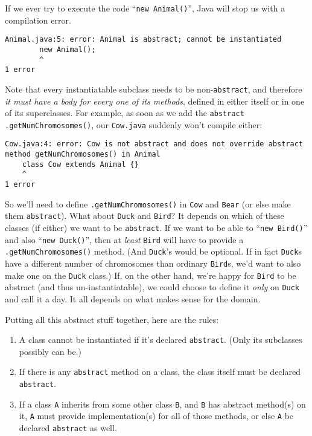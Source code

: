 If we ever try to execute the code ``\texttt{new Animal()}'', Java will stop us
with a compilation error.

\begin{Verbatim}[fontsize=\small,samepage=true]
Animal.java:5: error: Animal is abstract; cannot be instantiated
        new Animal();
        ^
1 error
\end{Verbatim}

\begin{samepage} Note that every instantiatable subclass needs to be
non-\texttt{abstract}, and therefore \textit{it must have a body for every one
of its methods}, defined in either itself or in one of its superclasses. For
example, as soon as we add the \texttt{abstract}
\texttt{.getNumChromosomes()}, our \texttt{Cow.java} suddenly won't compile
either:

\begin{Verbatim}[fontsize=\small,samepage=true]
Cow.java:4: error: Cow is not abstract and does not override abstract
method getNumChromosomes() in Animal
    class Cow extends Animal {}
    ^
1 error
\end{Verbatim}
\normalsize
\end{samepage}

So we'll need to define \texttt{.getNumChromosomes()} in \texttt{Cow} and
\texttt{Bear} (or else make them \texttt{abstract}). What about \texttt{Duck}
and \texttt{Bird}? It depends on which of these classes (if either) we want to
be \texttt{abstract}. If we want to be able to ``\texttt{new Bird()}'' and also
``\texttt{new Duck()}'', then at \textit{least} \texttt{Bird} will have to
provide a \texttt{.getNumChromosomes()} method. (And \texttt{Duck}'s would be
optional. If in fact \texttt{Duck}s have a different number of chromosomes
than ordinary \texttt{Bird}s, we'd want to also make one on the \texttt{Duck}
class.) If, on the other hand, we're happy for \texttt{Bird} to be abstract
(and thus un-instantiatable), we could choose to define it \textit{only} on
\texttt{Duck} and call it a day. It all depends on what makes sense for the
domain.

Putting all this abstract stuff together, here are the rules:

\begin{enumerate}
\itemsep.1em
\item A class cannot be instantiated if it's declared \texttt{abstract}. (Only
its subclasses possibly can be.)
\item If there is any \texttt{abstract} method on a class, the class itself
must be declared \texttt{abstract}.
\item If a class \texttt{A} inherits from some other class \texttt{B}, and
\texttt{B} has abstract method(s) on it, \texttt{A} must provide
implementation(s) for all of those methods, or else \texttt{A} be declared 
\texttt{abstract} as well.
\end{enumerate}

